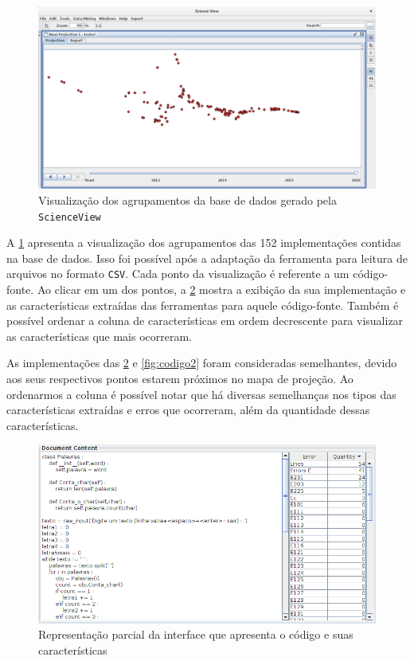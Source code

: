 		\begin{figure}[h]
			\centering
			\includegraphics[width=1\linewidth]{imagem/projecaoFinal} %
			\caption[Visualização dos agrupamentos da base de dados gerado pela \texttt{ScienceView}]
			{Visualização dos agrupamentos da base de dados gerado pela \texttt{ScienceView} \cite{Alencar-etal:2012}}
			\label{fig:projecaoFinal}
		\end{figure}
		
		A \cref{fig:projecaoFinal} apresenta a visualização dos agrupamentos das 152
		implementações contidas na base de dados. Isso foi possível após a adaptação da
		ferramenta para leitura de arquivos no formato \texttt{CSV}. Cada ponto da
		visualização é referente a um código-fonte. Ao clicar em um dos pontos, a
		\cref{fig:codigo1} mostra a exibição da sua implementação e
		as características extraídas das ferramentas para aquele código-fonte. Também
		é possível ordenar a coluna de características  em ordem
		decrescente para visualizar as características que mais ocorreram.
		
		As implementações das \cref{fig:codigo1} e \cref{fig:codigo2} foram consideradas
		semelhantes, devido aos seus respectivos pontos estarem próximos no mapa de
		projeção. Ao ordenarmos a coluna  é possível notar que há
		diversas semelhanças nos tipos das características extraídas e erros que
		ocorreram, além da quantidade dessas características.
		
		\begin{figure}[h]
			\centering
			\includegraphics[width=0.8\linewidth]{imagem/codigo1}
			\caption[Representação parcial da interface que apresenta o código e suas características]
			{Representação parcial da interface que apresenta o código e suas características \cite{Alencar-etal:2012}}
			\label{fig:codigo1}
		\end{figure}
		
